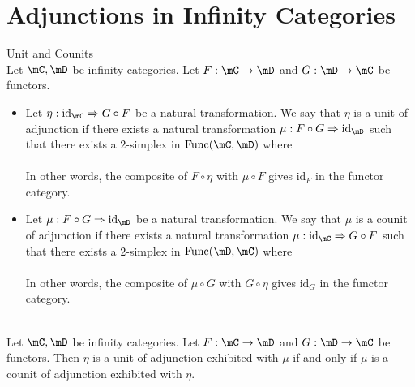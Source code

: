 \documentclass[a4paper]{article}
\begin{document}
\section{Adjunctions in Infinity Categories}
\begin{defn}{Unit and Counits}{}\\ Let $\mC,\mD$ be infinity categories. Let $F:\mC\to\mD$ and $G:\mD\to\mC$ be functors. 
\begin{itemize}
\item Let $\eta:\text{id}_\mC\Rightarrow G\circ F$ be a natural transformation. We say that $\eta$ is a unit of adjunction if there exists a natural transformation $\mu:F\circ G\Rightarrow\text{id}_\mD$ such that there exists a $2$-simplex in $\text{Func}(\mC,\mD)$ where \\
\\
In other words, the composite of $F\circ\eta$ with $\mu\circ F$ gives $\text{id}_F$ in the functor category. 
\item Let $\mu:F\circ G\Rightarrow\text{id}_\mD$ be a natural transformation. We say that $\mu$ is a counit of adjunction if there exists a natural transformation $\mu:\text{id}_\mC\Rightarrow G\circ F$ such that there exists a $2$-simplex in $\text{Func}(\mD,\mC)$ where \\
\\
In other words, the composite of $\mu\circ G$ with $G\circ\eta$ gives $\text{id}_G$ in the functor category. 
\end{itemize}
\end{defn}

\begin{lmm}{}{}\\ Let $\mC,\mD$ be infinity categories. Let $F:\mC\to\mD$ and $G:\mD\to\mC$ be functors. Then $\eta$ is a unit of adjunction exhibited with $\mu$ if and only if $\mu$ is a counit of adjunction exhibited with $\eta$. 
\end{lmm}
\end{document}

